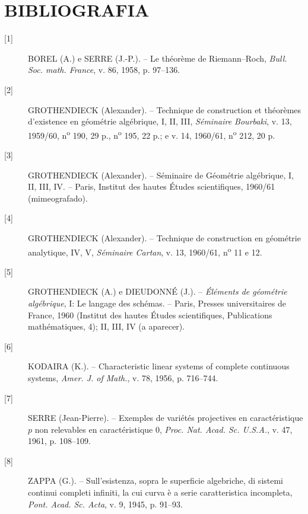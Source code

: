 \documentclass[11pt,twoside,openany]{book}
\numberwithin{equation}{section}
\theoremstyle{plain}
\theoremstyle{definition}
\theoremstyle{remark}
\begin{document}
\section*{BIBLIOGRAFIA}

\begin{description}
\item[{[1]}] BOREL (A.) e SERRE (J.-P.). -- Le théorème de Riemann--Roch,
\emph{Bull. Soc. math. France}, v. 86, 1958, p. 97--136.

\item[{[2]}] GROTHENDIECK (Alexander). -- Technique de construction et
théorèmes d'existence en géométrie algébrique, I, II, III, \emph{Séminaire
Bourbaki}, v. 13, 1959/60, n\textsuperscript{o} 190, 29 p.,
n\textsuperscript{o} 195, 22 p.; e v. 14, 1960/61,
n\textsuperscript{o} 212, 20 p.

\item[{[3]}] GROTHENDIECK (Alexander). -- Séminaire de Géométrie algébrique,
I, II, III, IV. -- Paris, Institut des hautes Études scientifiques, 1960/61
(mimeografado).

\item[{[4]}] GROTHENDIECK (Alexander). -- Technique de construction en
géométrie analytique, IV, V, \emph{Séminaire Cartan}, v. 13, 1960/61,
n\textsuperscript{o} 11 e 12.

\item[{[5]}] GROTHENDIECK (A.) e DIEUDONNÉ (J.). -- \emph{Éléments de
géométrie algébrique}, I: Le langage des schémas. -- Paris, Presses
universitaires de France, 1960 (Institut des hautes Études scientifiques,
Publications mathématiques, 4); II, III, IV (a aparecer).

\item[{[6]}] KODAIRA (K.). -- Characteristic linear systems of complete
continuous systems, \emph{Amer. J. of Math.}, v. 78, 1956, p. 716--744.

\item[{[7]}] SERRE (Jean-Pierre). -- Exemples de variétés projectives en
caractéristique $p$ non relevables en caractéristique 0, \emph{Proc. Nat. Acad.
Sc. U.S.A.}, v. 47, 1961, p. 108--109.

\item[{[8]}] ZAPPA (G.). -- Sull'esistenza, sopra le superficie algebriche, di
sistemi continui completi infiniti, la cui curva è a serie caratteristica
incompleta, \emph{Pont. Acad. Sc. Acta}, v. 9, 1945, p. 91--93.
\end{description}
\end{document}
